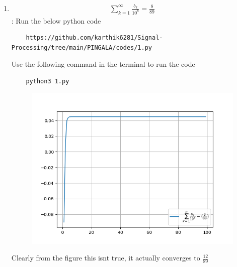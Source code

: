 \documentclass[journal,12pt,twocolumn]{IEEEtran}
\renewcommand\thesection{\arabic{section}}
\begin{document}
\begin{enumerate}[label=\thesection.\arabic*
,ref=\thesection.\theenumi]
\begin{figure}[h]
	\caption{}
\end{figure}
\item 
\begin{align}
	\sum_{k=1}^{\infty}\frac{b_k}{10^k} =\frac{8}{89}
\end{align}
\solution:
Run the below python code 
\begin{lstlisting}
	https://github.com/karthik6281/Signal-Processing/tree/main/PINGALA/codes/1.py
\end{lstlisting}
Use the following command in the terminal to run the code
\begin{lstlisting}
	python3 1.py
\end{lstlisting}
\begin{figure}[h]
	\centering
	\includegraphics[scale = 0.6]{./figs/1_4.png}
	\caption{}
\end{figure}
Clearly from the figure this isnt true, it actually converges to $\frac{12}{89}$
\end{enumerate}
\end{document}
